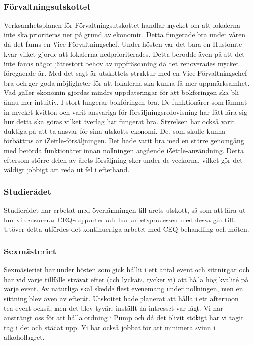 \documentclass[../_main/handlingar.tex]{subfiles}
\begin{document}
\subsubsection*{Förvaltningsutskottet}
Verksamhetsplanen för Förvaltningsutskottet handlar mycket om att lokalerna inte ska prioriteras ner på grund av ekonomin. Detta fungerade bra under våren då det fanns en Vice Förvaltningschef. Under hösten var det bara en Hustomte kvar vilket gjorde att lokalerna nedprioriterades. Detta berodde även på att det inte fanns något jättestort behov av uppfräschning då det renoverades mycket föregående år. Med det sagt är utskottets struktur med en Vice Förvaltningschef bra och ger goda möjligheter för att lokalerna ska kunna få mer uppmärksamhet. 
Vad gäller ekonomin gjordes mindre uppdateringar för att bokföringen ska bli ännu mer intuitiv. I stort fungerar bokföringen bra. De funktionärer som lämnat in mycket kvitton och varit ansvariga för försäljningsredovisning har fått lära sig hur detta ska göras vilket överlag har fungerat bra. Styrelsen har också varit duktiga på att ta ansvar för sina utskotts ekonomi. Det som skulle kunna förbättras är iZettle-försäljningen. Det hade varit bra med en större genomgång med berörda funktionärer innan nollningen angående iZettle-användning. Detta eftersom större delen av årets försäljning sker under de veckorna, vilket gör det väldigt jobbigt att reda ut fel i efterhand.

\subsubsection*{Studierådet}
Studierådet har arbetat med överlämningen till årets utskott, så som att lära ut hur vi censurerar CEQ-rapporter och hur arbetsprocessen med dessa går till. Utöver detta utfördes det kontinuerliga arbetet med CEQ-behandling och möten.

\subsubsection*{Sexmästeriet}
Sexmästeriet har under hösten som gick hållit i ett antal event och sittningar och har vid varje tillfälle strävat efter (och lyckats, tycker vi) att hålla hög kvalité på varje event. Av naturliga skäl skedde flest evenemang under nollningen, men en sittning blev även av efteråt. Utskottet hade planerat att hålla i ett afternoon tea-event också, men det blev tyvärr inställt då intresset var lågt. Vi har ansträngt oss för att hålla ordning i Pump och då det blivit stökigt har vi tagit tag i det och städat upp. Vi har också jobbat för att minimera svinn i alkohollagret.
\end{document}
